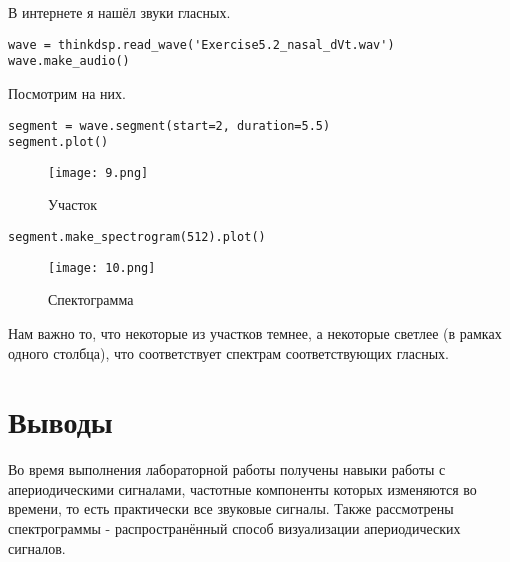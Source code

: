 \documentclass[a4paper,12pt]{report}
\begin{document}
В интернете я нашёл звуки гласных.

\begin{lstlisting}[caption=Загрузка и прослушивание звука]
wave = thinkdsp.read_wave('Exercise5.2_nasal_dVt.wav')
wave.make_audio()
\end{lstlisting}

Посмотрим на них.

\begin{lstlisting}[caption=Участок]
segment = wave.segment(start=2, duration=5.5)
segment.plot()
\end{lstlisting}

\begin{figure}[H]
        \centering
        \texttt{[image: 9.png]}
        \caption{Участок}
        \label{fig:lab3_fig9}
\end{figure}


\begin{lstlisting}[caption=Спектограмма]
segment.make_spectrogram(512).plot()
\end{lstlisting}

\begin{figure}[H]
        \centering
        \texttt{[image: 10.png]}
        \caption{Спектограмма}
        \label{fig:lab3_fig10}
\end{figure}

Нам важно то, что некоторые из участков темнее, а некоторые светлее (в рамках одного столбца), что соответствует спектрам соответствующих гласных.


\chapter{Выводы}

Во время выполнения лабораторной работы получены навыки работы с апериодическими сигналами, частотные компоненты которых изменяются во времени, то есть практически все звуковые сигналы. Также рассмотрены спектрограммы - распространённый способ визуализации апериодических сигналов.
\end{document}
